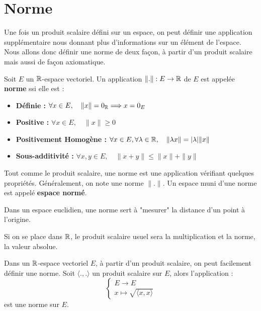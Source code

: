 \section{Norme}

Une fois un produit scalaire défini sur un espace, on peut définir une application supplémentaire nous donnant plus d'informations 
sur un élément de l'espace. Nous allons donc définir une norme de deux façon, à partir d'un produit scalaire mais aussi 
de façon axiomatique. 

\begin{definition}[Norme]
    Soit $E$ un $\mathbb{R}$-espace vectoriel. Un application $\|.\| : E \rightarrow \mathbb{R}$ de $E$ est appelée \textbf{norme} ssi elle est : 
    \begin{itemize}
        \item \textbf{Définie : } $ \forall x \in E, \quad \|x \| = 0_{\mathbb{R}} \Longrightarrow x = 0_E $
        \item \textbf{Positive : } $ \forall x \in E, \quad \| x \| \geqslant 0 $
        \item \textbf{Positivement Homogène : } $ \forall x \in E, \forall \lambda \in \mathbb{R}, \quad \| \lambda x \| = |\lambda | \| x\| $  
        \item \textbf{Sous-additivité : } $ \forall x,y \in E, \quad \| x + y \| \leqslant \| x \| + \|y\| $
    \end{itemize}    
\end{definition}

\begin{remark}
    Tout comme le produit scalaire, une norme est une application vérifiant quelques propriétés. 
    Généralement, on note une norme $\|.\|$. Un espace muni d'une norme est appelé \textbf{espace normé}. 

    Dans un espace euclidien, une norme sert à "mesurer" la distance d'un point à l'origine. 
\end{remark}

\begin{example}
    Si on se place dans $\mathbb{R}$, le produit scalaire usuel sera la multiplication et la norme, la valeur absolue. 
\end{example}

\begin{proposition}
    Dans un $\mathbb{R}$-espace vectoriel $E$, à partir d'un produit scalaire, on peut facilement définir une norme. 
    Soit $\langle .,. \rangle$ un produit scalaire sur $E$, alors l'application :
        \[
            \begin{cases}
                E \longrightarrow E \\
                x \longmapsto \sqrt{\langle x,x \rangle}
            \end{cases}
        \] 
    est une norme sur $E$. 
\end{proposition}

